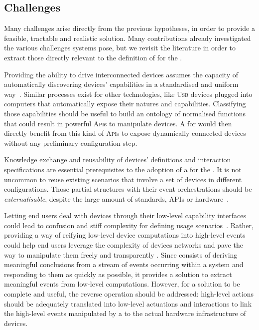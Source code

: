 \subsection{Challenges}
\label{sec:Motivation-Challenges}

Many challenges arise directly from the previous hypotheses, in order to provide a feasible, tractable and realistic \IOT solution. Many contributions already investigated the various challenges \IOT systems pose, but we revisit the literature in order to extract those directly relevant to the definition of \DSLS for the \IOT.

\begin{description}[leftmargin=0cm]
	\item[Capability Discovery] Providing the ability to drive interconnected devices assumes the capacity of automatically discovering devices' capabilities in a standardised and uniform way~\cite{chaqfeh-12}. Similar processes exist for other technologies, like \textsc{Usb} devices plugged into computers that automatically expose their natures and capabilities. Classifying those capabilities should be useful to build an ontology of normalised functions that could result in powerful \textsc{Api}s to manipulate devices. A \DSL for \IOT would then directly benefit from this kind of \textsc{Api}s to expose dynamically connected devices without any preliminary configuration step.
	
	\item[Reusability] Knowledge exchange and reusability of devices' definitions and interaction specifications are essential prerequisites to the adoption of a \DSL for the \IOT. It is not uncommon to reuse existing scenarios that involve a set of devices in different configurations. Those partial \IOT structures with their event orchestrations should be \emph{externalisable}, despite the large amount of standards, \textsc{API}s or hardware~\cite{ma-14}.

	\item[Complex Event Processing (\CEP)] Letting end users deal with devices through their low-level capability interfaces could lead to confusion and stiff complexity for defining usage scenarios~\cite{ma-13}. Rather, providing a way of reifying low-level device computations into high-level events could help end users leverage the complexity of devices networks and pave the way to manipulate them freely and transparently \cite{cugola-12}. Since \CEP consists of deriving meaningful conclusions from a stream of events occurring within a system and responding to them as quickly as possible, it provides a solution to extract meaningful events from low-level computations. However, for a solution to be complete and useful, the reverse operation should be addressed: high-level actions should be adequately translated into low-level actuations and interactions to link the high-level events manipulated by a \DSL to the actual hardware infrastructure of devices.
	

\end{description}
